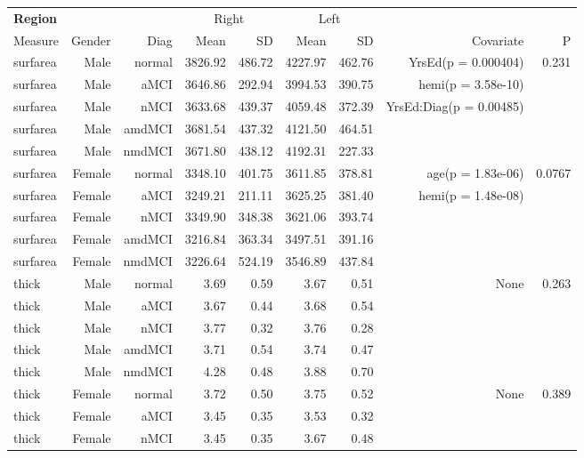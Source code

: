 \documentclass[12pt]{article}
\newcommand\T{\rule{0pt}{2.6ex}}
\newcommand\B{\rule[-1.2ex]{0pt}{0pt}}
\begin{document}
\newpage
\begin{sidewaystable}
  \centering
	\footnotesize
	\begin{tabular}{l|rr|rr|rr|rr}
	\hline
	\textbf{Region} & & & \multicolumn{2}{c}{Right} \T & \multicolumn{2}{|c}{Left} & & \\
	\multicolumn{1}{l|}{Measure} \T\B & Gender & Diag & Mean & SD & Mean & SD & Covariate & P \\
	\hline\hline
 surfarea & Male & normal & 3826.92 & 486.72 & 4227.97 & 462.76 & YrsEd(p = 0.000404) & 0.231 \\ 
  surfarea & Male & aMCI & 3646.86 & 292.94 & 3994.53 & 390.75 & hemi(p = 3.58e-10) &  \\ 
  surfarea & Male & nMCI & 3633.68 & 439.37 & 4059.48 & 372.39 & YrsEd:Diag(p = 0.00485) &  \\ 
  surfarea & Male & amdMCI & 3681.54 & 437.32 & 4121.50 & 464.51 &  &  \\ 
  surfarea & Male & nmdMCI & 3671.80 & 438.12 & 4192.31 & 227.33 &  &  \\ 
   \hline
surfarea & Female & normal & 3348.10 & 401.75 & 3611.85 & 378.81 & age(p = 1.83e-06) & 0.0767 \\ 
  surfarea & Female & aMCI & 3249.21 & 211.11 & 3625.25 & 381.40 & hemi(p = 1.48e-08) &  \\ 
  surfarea & Female & nMCI & 3349.90 & 348.38 & 3621.06 & 393.74 &  &  \\ 
  surfarea & Female & amdMCI & 3216.84 & 363.34 & 3497.51 & 391.16 &  &  \\ 
  surfarea & Female & nmdMCI & 3226.64 & 524.19 & 3546.89 & 437.84 &  &  \\ 
   \hline
thick & Male & normal & 3.69 & 0.59 & 3.67 & 0.51 & None & 0.263 \\ 
  thick & Male & aMCI & 3.67 & 0.44 & 3.68 & 0.54 &  &  \\ 
  thick & Male & nMCI & 3.77 & 0.32 & 3.76 & 0.28 &  &  \\ 
  thick & Male & amdMCI & 3.71 & 0.54 & 3.74 & 0.47 &  &  \\ 
  thick & Male & nmdMCI & 4.28 & 0.48 & 3.88 & 0.70 &  &  \\ 
   \hline
thick & Female & normal & 3.72 & 0.50 & 3.75 & 0.52 & None & 0.389 \\ 
  thick & Female & aMCI & 3.45 & 0.35 & 3.53 & 0.32 &  &  \\ 
  thick & Female & nMCI & 3.45 & 0.35 & 3.67 & 0.48 &  &  \\ 

\end{tabular}
\end{sidewaystable}
\end{document}
